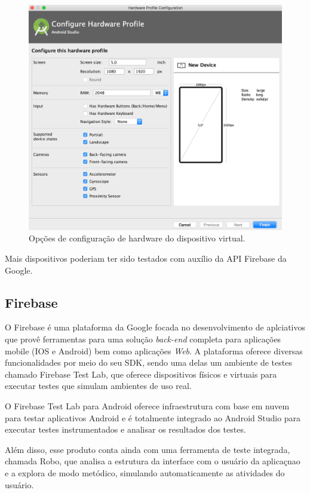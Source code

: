 	\begin{figure}[!htb]
       \begin{center}  
          \includegraphics[width=0.8\columnwidth]{img/hw_dispositivo_virtual.png}
           \caption{\label{fig:hw_dispositivo_virtual}Opções de configuração de hardware do dispositivo virtual.}
       \end{center}
   \end{figure}
\clearpage   


Mais dispositivos poderiam ter sido testados com auxílio da API Firebase da Google. 

\subsection{Firebase}

O Firebase é uma plataforma da Google focada no desenvolvimento de aplciativos que provê ferramentas para uma solução \textit{back-end} completa para aplicações mobile (IOS e Android) bem como aplicações \textit{Web}. A plataforma oferece diversas funcionalidades por meio do seu SDK, sendo uma delas um ambiente de testes chamado Firebase Test Lab, que oferece dispositivos físicos e virtuais para executar testes que simulam ambientes de uso real. 

O Firebase Test Lab para Android oferece infraestrutura com base em nuvem para testar aplicativos Android e é totalmente integrado ao Android Studio para executar testes instrumentados e analisar os resultados dos testes. \cite{firebasetestlab}

Além disso, esse produto conta ainda com uma ferramenta de teste integrada, chamada Robo, que analisa a estrutura da interface com o usuário da aplicaçnao e a explora de modo metódico, simulando automaticamente as atividades do usuário.

